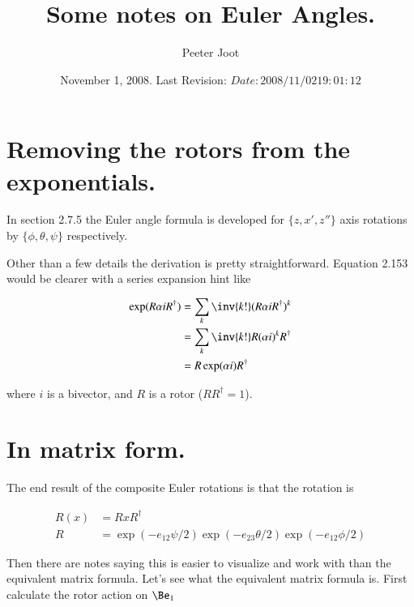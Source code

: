 \documentclass{article}
\title{Some notes on Euler Angles.}
\author{Peeter Joot}
\date{ November 1, 2008. Last Revision: $Date: 2008/11/02 19:01:12 $ }
\begin{document}
\maketitle{}
\tableofcontents

\section{ Removing the rotors from the exponentials. }

In \cite{doran2003gap} section 2.7.5 the Euler angle formula is 
developed for $\{z,x',z''\}$ axis rotations by $\{\phi, \theta, \psi\}$
respectively.

Other than a few details the derivation is pretty straightforward.  Equation
2.153 would be clearer with a series expansion hint like

\begin{align*}
\exp(R \alpha i R^\dagger) 
&= \sum_k \inv{k!} (R \alpha i R^\dagger)^k \\
&= \sum_k \inv{k!} R (\alpha i)^k R^\dagger \\
&= R \exp(\alpha i) R^\dagger
\end{align*}

where $i$ is a bivector, and $R$ is a rotor ($RR^\dagger = 1$).

\section{ In matrix form. }

The end result of the composite Euler rotations is that the rotation is

\begin{align*}
R(x) &= R x R^\dagger \\
R &= \exp(-e_{12}\psi/2) \exp(-e_{23}\theta/2) \exp(-e_{12}\phi/2)
\end{align*}

Then there are notes saying this is easier to visualize and work with than
the equivalent matrix formula.  Let's see what the equivalent matrix formula
is.  First calculate the rotor action on $\Be_1$
\end{document}
